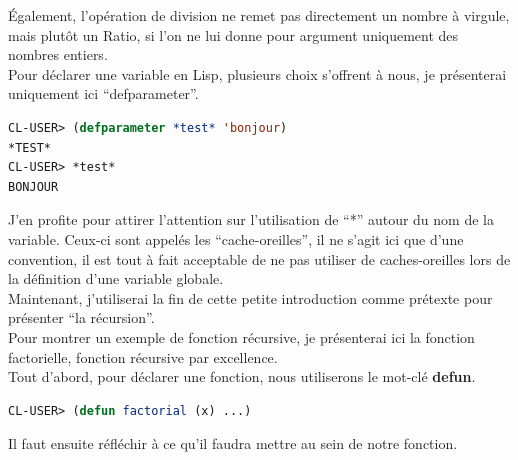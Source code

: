 \documentclass[a4paper, 12pt]{article}
\numberwithin{equation}{subsection}
\begin{document}
Également, l'opération de division ne remet pas directement un nombre à virgule, mais plutôt un Ratio, si l'on ne lui donne pour argument uniquement des nombres entiers. \\

Pour déclarer une variable en Lisp, plusieurs choix s'offrent à nous, je présenterai uniquement ici ``defparameter''.
\begin{lstlisting}[language=Lisp]
CL-USER> (defparameter *test* 'bonjour)
*TEST*
CL-USER> *test*
BONJOUR
\end{lstlisting}
J'en profite pour attirer l'attention sur l'utilisation de ``*'' autour du nom de la variable. Ceux-ci sont appelés les ``cache-oreilles'', il ne s'agit ici que d'une convention, il est tout à fait acceptable de ne pas utiliser de caches-oreilles lors de la définition d'une variable globale. \\

Maintenant, j'utiliserai la fin de cette petite introduction comme prétexte pour présenter ``la récursion''. \\

Pour montrer un exemple de fonction récursive, je présenterai ici la fonction factorielle, fonction récursive par excellence. \\

Tout d'abord, pour déclarer une fonction, nous utiliserons le mot-clé {\bf defun}.
\begin{lstlisting}[language=Lisp]
CL-USER> (defun factorial (x) ...)
\end{lstlisting}
Il faut ensuite réfléchir à ce qu'il faudra mettre au sein de notre fonction. \\
\end{document}
